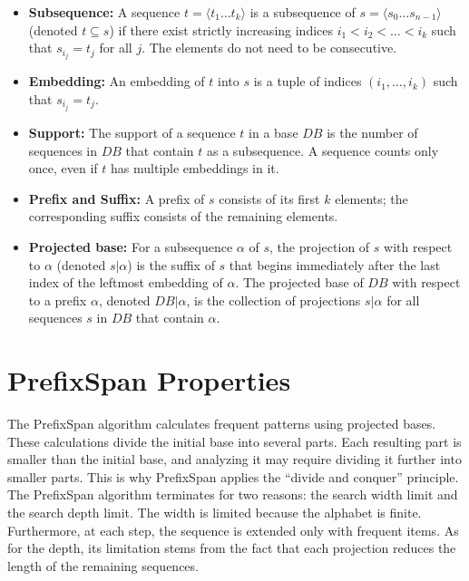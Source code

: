 \documentclass[11pt,a4paper]{article}
\begin{document}
\begin{itemize}
	\item \textbf{Subsequence:} A sequence $t = \langle t_1 \dots t_k \rangle$ is a subsequence of $s = \langle s_0 \dots s_{n-1}\rangle$ (denoted $t \subseteq s$) if there exist strictly increasing indices $i_1 < i_2 < \dots < i_k$ such that $s_{i_j} = t_j$ for all $j$. The elements do not need to be consecutive.
	\item \textbf{Embedding:}  An embedding of $t$ into $s$ is a tuple of indices $(i_1, \dots, i_k)$ such that $s_{i_j} = t_j$.
	\item \textbf{Support:} The support of a sequence $t$ in a base $DB$ is the number of sequences in $DB$ that contain $t$ as a subsequence. A sequence counts only once, even if $t$ has multiple embeddings in it.
	\item \textbf{Prefix and Suffix:} A prefix of $s$ consists of its first $k$ elements; the corresponding suffix consists of the remaining elements.
	\item \textbf{Projected base:} For a subsequence $\alpha$ of $s$, the projection of $s$ with respect to $\alpha$ (denoted $s | \alpha$) is the suffix of $s$ that begins immediately after the last index of the leftmost embedding of $\alpha$. The projected base of $DB$ with respect to a prefix $\alpha$, denoted $DB|\alpha$, is the collection of projections $s | \alpha$ for all sequences $s$ in $DB$ that contain $\alpha$.
\end{itemize}


\section*{PrefixSpan Properties}

The PrefixSpan algorithm calculates frequent patterns using projected bases. These calculations divide the initial base into several parts. Each resulting part is smaller than the initial base, and analyzing it may require dividing it further into smaller parts. This is why PrefixSpan applies the “divide and conquer” principle.\\

The PrefixSpan algorithm terminates for two reasons: the search width limit and the search depth limit. The width is limited because the alphabet is finite. Furthermore, at each step, the sequence is extended only with frequent items. As for the depth, its limitation stems from the fact that each projection reduces the length of the remaining sequences.
\end{document}
